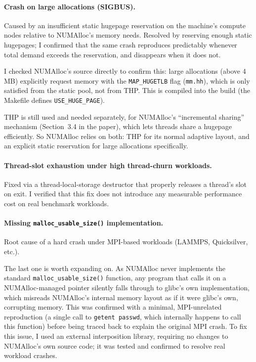 \documentclass[11pt,a4paper]{article}
\begin{document}
\paragraph{Crash on large allocations (SIGBUS).}
Caused by an insufficient static hugepage reservation on the machine's compute nodes relative to NUMAlloc's memory needs. Resolved by reserving enough static hugepages; I confirmed that the same crash reproduces predictably whenever total demand exceeds the reservation, and disappears when it does not.

I checked NUMAlloc's source directly to confirm this: large allocations (above 4\,MB) explicitly request memory with the \texttt{MAP\_HUGETLB} flag (\texttt{mm.hh}), which is only satisfied from the static pool, not from THP. This is compiled into the build (the Makefile defines \texttt{USE\_HUGE\_PAGE}).

THP is still used and needed separately, for NUMAlloc's ``incremental sharing'' mechanism (Section~3.4 in the paper), which lets threads share a hugepage efficiently. So NUMAlloc relies on both: THP for its normal adaptive layout, and an explicit static reservation for large allocations specifically.

\paragraph{Thread-slot exhaustion under high thread-churn workloads.}
Fixed via a thread-local-storage destructor that properly releases a thread's slot on exit. I verified that this fix does not introduce any measurable performance cost on real benchmark workloads.

\paragraph{Missing \texttt{malloc\_usable\_size()} implementation.}
Root cause of a hard crash under MPI-based workloads (LAMMPS, Quicksilver, etc.).

The last one is worth expanding on. As NUMAlloc never implements the standard \texttt{malloc\_usable\_size()} function, any program that calls it on a NUMAlloc-managed pointer silently falls through to glibc's own implementation, which misreads NUMAlloc's internal memory layout as if it were glibc's own, corrupting memory. This was confirmed with a minimal, MPI-unrelated reproduction (a single call to \texttt{getent passwd}, which internally happens to call this function) before being traced back to explain the original MPI crash. To fix this issue, I used an external interposition library, requiring no changes to NUMAlloc's own source code; it was tested and confirmed to resolve real workload crashes.
\end{document}
